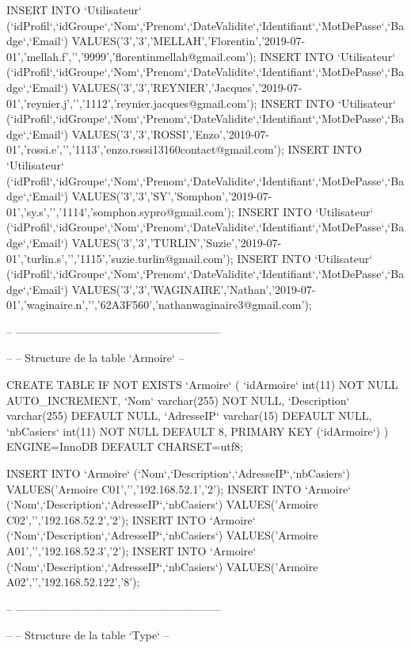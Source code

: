\begin{DoxyCode}
INSERT INTO `Utilisateur`
       (`idProfil`,`idGroupe`,`Nom`,`Prenom`,`DateValidite`,`Identifiant`,`MotDePasse`,`Badge`,`Email`)
       VALUES('3','3','MELLAH','Florentin','2019-07-01','mellah.f','','9999','florentinmellah@gmail.com');
INSERT INTO `Utilisateur`
       (`idProfil`,`idGroupe`,`Nom`,`Prenom`,`DateValidite`,`Identifiant`,`MotDePasse`,`Badge`,`Email`)
       VALUES('3','3','REYNIER','Jacques','2019-07-01','reynier.j','','1112','reynier.jacques@gmail.com');
INSERT INTO `Utilisateur`
       (`idProfil`,`idGroupe`,`Nom`,`Prenom`,`DateValidite`,`Identifiant`,`MotDePasse`,`Badge`,`Email`)
       VALUES('3','3','ROSSI','Enzo','2019-07-01','rossi.e','','1113','enzo.rossi13160contact@gmail.com');
INSERT INTO `Utilisateur`
       (`idProfil`,`idGroupe`,`Nom`,`Prenom`,`DateValidite`,`Identifiant`,`MotDePasse`,`Badge`,`Email`) VALUES('3','3','SY','Somphon','2019-07-01','sy.s','','1114','somphon.sypro@gmail.com');
INSERT INTO `Utilisateur`
       (`idProfil`,`idGroupe`,`Nom`,`Prenom`,`DateValidite`,`Identifiant`,`MotDePasse`,`Badge`,`Email`) VALUES('3','3','TURLIN','Suzie','2019-07-01','turlin.s','','1115','suzie.turlin@gmail.com');
INSERT INTO `Utilisateur`
       (`idProfil`,`idGroupe`,`Nom`,`Prenom`,`DateValidite`,`Identifiant`,`MotDePasse`,`Badge`,`Email`)
       VALUES('3','3','WAGINAIRE','Nathan','2019-07-01','waginaire.n','','62A3F560','nathanwaginaire3@gmail.com');

-- --------------------------------------------------------

--
-- Structure de la table `Armoire`
--

CREATE TABLE IF NOT EXISTS `Armoire` (
  `idArmoire` int(11) NOT NULL AUTO\_INCREMENT,
  `Nom` varchar(255) NOT NULL,
  `Description` varchar(255) DEFAULT NULL,
  `AdresseIP` varchar(15) DEFAULT NULL,
  `nbCasiers` int(11) NOT NULL DEFAULT 8,
  PRIMARY KEY (`idArmoire`)
) ENGINE=InnoDB DEFAULT CHARSET=utf8;

INSERT INTO `Armoire` (`Nom`,`Description`,`AdresseIP`,`nbCasiers`) VALUES('Armoire
       C01','','192.168.52.1','2');
INSERT INTO `Armoire` (`Nom`,`Description`,`AdresseIP`,`nbCasiers`) VALUES('Armoire
       C02','','192.168.52.2','2');
INSERT INTO `Armoire` (`Nom`,`Description`,`AdresseIP`,`nbCasiers`) VALUES('Armoire
       A01','','192.168.52.3','2');
INSERT INTO `Armoire` (`Nom`,`Description`,`AdresseIP`,`nbCasiers`) VALUES('Armoire
       A02','','192.168.52.122','8');

-- --------------------------------------------------------

--
-- Structure de la table `Type`
--


\end{DoxyCode}
